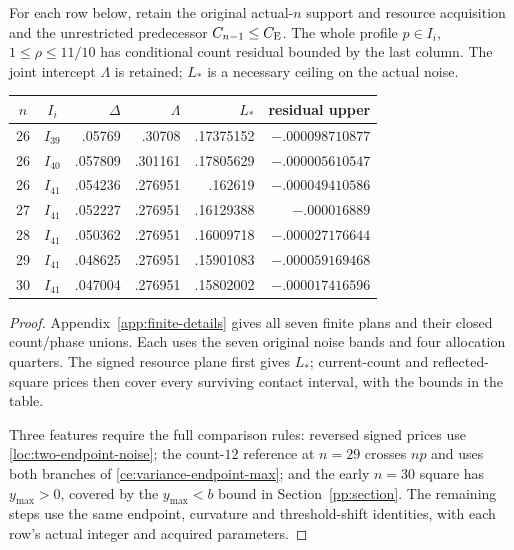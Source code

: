\begin{proposition}\label{fc:lowprofiles}
For each row below, retain the original actual-$n$ support and resource
acquisition and the unrestricted predecessor $C_{n-1}\le C_{\mathrm E}$.
The whole profile $p\in I_i$, $1\le\rho\le11/10$ has conditional
count residual bounded by the last column. The joint intercept
$\Lambda$ is retained; $L_*$ is a necessary ceiling on the actual noise.
\begin{center}\small\setlength{\tabcolsep}{3pt}
\begin{tabular}{ccrrrr}\toprule
$n$ & $I_i$ & $\Delta$ & $\Lambda$ & $L_*$ & residual upper\\\midrule
26 & $I_{39}$ & .05769 & .30708 & .17375152 & $-.000098710877$\\
26 & $I_{40}$ & .057809 & .301161 & .17805629 & $-.000005610547$\\
26 & $I_{41}$ & .054236 & .276951 & .162619 & $-.000049410586$\\
27 & $I_{41}$ & .052227 & .276951 & .16129388 & $-.000016889$\\
28 & $I_{41}$ & .050362 & .276951 & .16009718 & $-.000027176644$\\
29 & $I_{41}$ & .048625 & .276951 & .15901083 & $-.000059169468$\\
30 & $I_{41}$ & .047004 & .276951 & .15802002 & $-.000017416596$\\
\bottomrule\end{tabular}\end{center}
\end{proposition}
\begin{proof}
Appendix~\ref{app:finite-details} gives all seven finite plans and their
closed count/phase unions. Each uses the seven original noise bands and
four allocation quarters. The signed resource plane first gives $L_*$;
current-count and reflected-square prices then cover every surviving
contact interval, with the bounds in the table.

Three features require the full comparison rules: reversed signed
prices use \eqref{loc:two-endpoint-noise}; the count-$12$ reference at
$n=29$ crosses $np$ and uses both branches of
\eqref{ce:variance-endpoint-max}; and the early $n=30$ square has
$y_{\max}>0$, covered by the $y_{\max}<b$ bound in Section~\ref{pp:section}.
The remaining steps use the same endpoint, curvature and threshold-shift
identities, with each row's actual integer and acquired parameters.
\end{proof}

